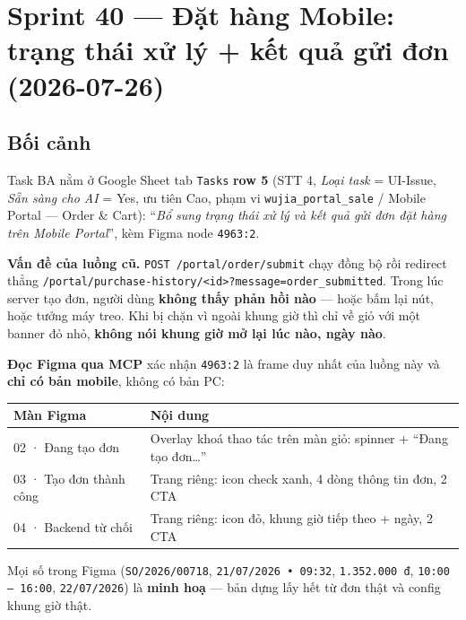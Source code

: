 \chapter{Sprint 40 --- Đặt hàng Mobile: trạng thái xử lý + kết quả gửi đơn (2026-07-26)}

\section{Bối cảnh}

Task BA nằm ở Google Sheet tab \texttt{Tasks} \textbf{row 5} (STT 4, \emph{Loại task} = UI-Issue,
\emph{Sẵn sàng cho AI} = Yes, ưu tiên Cao, phạm vi \texttt{wujia\_portal\_sale} / Mobile Portal ---
Order \& Cart): ``\emph{Bổ sung trạng thái xử lý và kết quả gửi đơn đặt hàng trên Mobile Portal}'',
kèm Figma node \texttt{4963:2}.

\textbf{Vấn đề của luồng cũ.} \texttt{POST /portal/order/submit} chạy đồng bộ rồi redirect thẳng
\texttt{/portal/purchase-history/<id>?message=order\_submitted}. Trong lúc server tạo đơn, người
dùng \textbf{không thấy phản hồi nào} --- hoặc bấm lại nút, hoặc tưởng máy treo. Khi bị chặn vì
ngoài khung giờ thì chỉ về giỏ với một banner đỏ nhỏ, \textbf{không nói khung giờ mở lại lúc nào,
ngày nào}.

\textbf{Đọc Figma qua MCP} xác nhận \texttt{4963:2} là frame duy nhất của luồng này và
\textbf{chỉ có bản mobile}, không có bản PC:

\begin{center}
\begin{tabular}{ll}
\hline
\textbf{Màn Figma} & \textbf{Nội dung} \\
\hline
02 · Đang tạo đơn & Overlay khoá thao tác trên màn giỏ: spinner + ``Đang tạo đơn\ldots'' \\
03 · Tạo đơn thành công & Trang riêng: icon check xanh, 4 dòng thông tin đơn, 2 CTA \\
04 · Backend từ chối & Trang riêng: icon đỏ, khung giờ tiếp theo + ngày, 2 CTA \\
\hline
\end{tabular}
\end{center}

Mọi số trong Figma (\texttt{SO/2026/00718}, \texttt{21/07/2026 • 09:32}, \texttt{1.352.000 đ},
\texttt{10:00 -- 16:00}, \texttt{22/07/2026}) là \textbf{minh hoạ} --- bản dựng lấy hết từ đơn thật
và config khung giờ thật.

